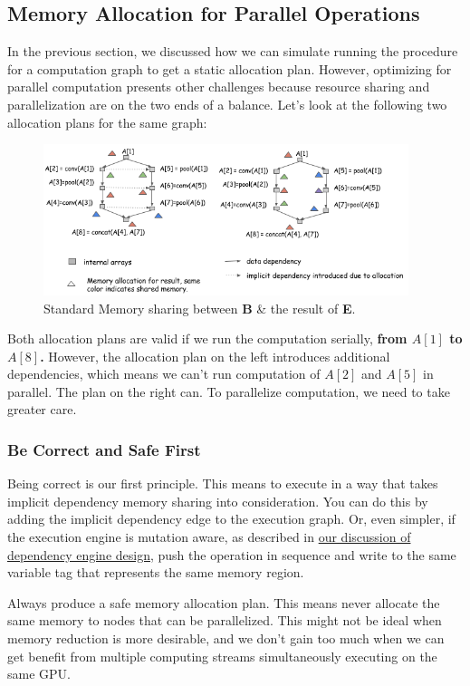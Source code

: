 \subsection{Memory Allocation for Parallel Operations}
In the previous section, we discussed how we can simulate running the procedure for a computation graph to get a static allocation plan. However, optimizing for parallel computation presents other challenges because resource sharing and parallelization are on the two ends of a balance. Let’s look at the following two allocation plans for the same graph:
\begin{figure}[!hbtp]
\centering
\includegraphics[width=0.95\textwidth]{MXNet/parallel_alloc}
\caption{Standard Memory sharing between \textbf{B} \& the result of \textbf{E}.}
\end{figure}

Both allocation plans are valid if we run the computation serially, {\bfseries from $A[1]$ to $A[8]$. } However, the allocation plan on the left introduces additional dependencies, which means we can't run computation of $A[2]$ and $A[5]$ in parallel. The plan on the right can. To parallelize computation, we need to take greater care. 

\subsubsection{Be Correct and Safe First}
Being correct is our first principle. This means to execute in a way that takes implicit dependency memory sharing into consideration. You can do this by adding the implicit dependency edge to the execution graph. Or, even simpler, if the execution engine is mutation aware, as described in \href{https://mxnet.incubator.apache.org/architecture/note_engine.html}{our discussion of dependency engine design}, push the operation in sequence and write to the same variable tag that represents the same memory region.

Always produce a safe memory allocation plan. This means never allocate the same memory to nodes that can be parallelized. This might not be ideal when memory reduction is more desirable, and we don’t gain too much when we can get benefit from multiple computing streams simultaneously executing on the same GPU.


